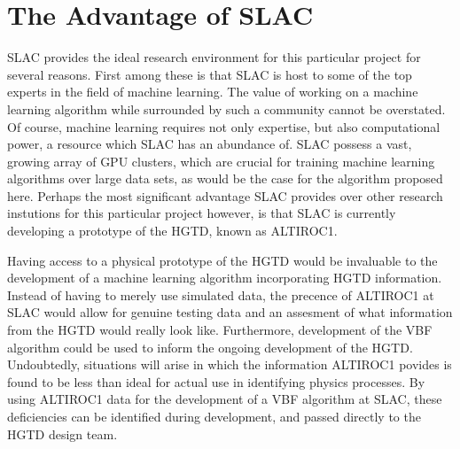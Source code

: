 \documentclass[paper=a4,fontsize=12pt]{article}
\begin{document}
\section*{The Advantage of SLAC}
    SLAC provides the ideal research environment for this particular project for several reasons. First among these is that SLAC is host to some of the top experts in the field of machine learning. The value of working on a machine learning algorithm while surrounded by such a community cannot be overstated. Of course, machine learning requires not only expertise, but also computational power, a resource which SLAC has an abundance of. SLAC possess a vast, growing array of GPU clusters, which are crucial for training machine learning algorithms over large data sets, as would be the case for the algorithm proposed here. Perhaps the most significant advantage SLAC provides over other research instutions for this particular project however, is that SLAC is currently developing a prototype of the HGTD, known as ALTIROC1.

    Having access to a physical prototype of the HGTD would be invaluable to the development of a machine learning algorithm incorporating HGTD information. Instead of having to merely use simulated data, the precence of ALTIROC1 at SLAC would allow for genuine testing data and an assesment of what information from the HGTD would really look like. Furthermore, development of the VBF algorithm could be used to inform the ongoing development of the HGTD. Undoubtedly, situations will arise in which the information ALTIROC1 povides is found to be less than ideal for actual use in identifying physics processes. By using ALTIROC1 data for the development of a VBF algorithm at SLAC, these deficiencies can be identified during development, and passed directly to the HGTD design team.



\end{document}
